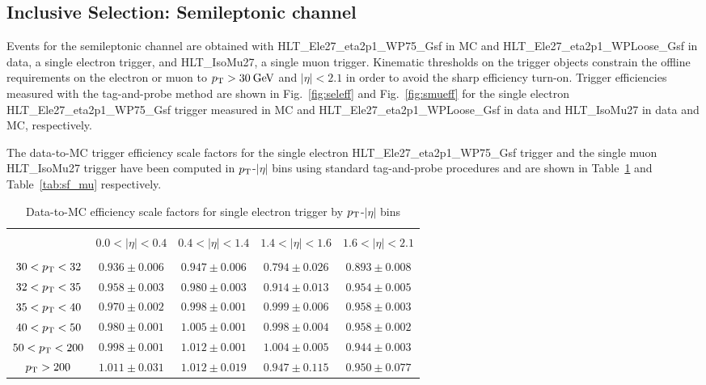 \subsection{Inclusive Selection: Semileptonic channel}
\label{subsec:sel_incl_semilept}

Events for the semileptonic channel are obtained with HLT\_Ele27\_eta2p1\_WP75\_Gsf in MC and HLT\_Ele27\_eta2p1\_WPLoose\_Gsf in data, a single electron trigger, and HLT\_IsoMu27, a single muon trigger. Kinematic thresholds on the trigger objects constrain the offline requirements on the electron or muon to $p_\mathrm{T}>30\:\mathrm{Ge\kern -0.1em V}$ and $|\eta|<2.1$ in order to avoid the sharp efficiency turn-on. Trigger efficiencies measured with the tag-and-probe method are shown in Fig.~\ref{fig:seleff} and Fig.~\ref{fig:smueff} for the single electron HLT\_Ele27\_eta2p1\_WP75\_Gsf trigger measured in MC and HLT\_Ele27\_eta2p1\_WPLoose\_Gsf in data and HLT\_IsoMu27 in data and MC, respectively.

The data-to-MC trigger efficiency scale factors for the single electron HLT\_Ele27\_eta2p1\_WP75\_Gsf trigger and the single muon HLT\_IsoMu27 trigger have been computed in $p_\mathrm{T}$-$|\eta|$ bins using standard tag-and-probe procedures and are shown in Table~\ref{tab:sf_ele} and Table~\ref{tab:sf_mu} respectively. 

\begin{table}[!ht]
\centering
\begin{tabular}{|c|c|c|c|c|}
\hline
&                                &                                &                                &                                                                 \\   
& $0.0 < |\eta| < 0.4$ & $0.4 < |\eta| < 1.4$ & $1.4 < |\eta| < 1.6$ & $1.6 < |\eta| < 2.1$    \\
&                                &                                &                                &                                                                \\   
\hline
$30 < p_\mathrm{T} <  32$ &  $0.936 \pm  0.006$  &  $0.947 \pm  0.006$  &  $0.794 \pm  0.026$  &  $0.893 \pm  0.008$ \\
\hline
$32 < p_\mathrm{T} <  35$ &  $0.958 \pm  0.003$  &  $0.980 \pm  0.003$  &  $0.914 \pm  0.013$  &  $0.954 \pm  0.005$ \\
\hline
$35 <p_\mathrm{T}  <  40$ &  $0.970 \pm  0.002$  &  $0.998 \pm  0.001$  &  $0.999 \pm  0.006$  &  $0.958 \pm  0.003$ \\
\hline
$40 < p_\mathrm{T} <  50$ &  $0.980 \pm  0.001$  &  $1.005 \pm  0.001$  &  $0.998 \pm  0.004$  &  $0.958 \pm  0.002$ \\
\hline
$50 < p_\mathrm{T} < 200$ & $0.998 \pm  0.001$  &  $1.012 \pm  0.001$  &  $1.004 \pm  0.005$  &  $0.944 \pm  0.003$ \\
\hline
      $p_\mathrm{T} > 200$   & $1.011 \pm  0.031$  &  $1.012 \pm  0.019$  &  $0.947 \pm  0.115$  &  $0.950 \pm  0.077 $\\	
\hline	
	
\end{tabular}
\caption{Data-to-MC efficiency scale factors for single electron trigger by $p_\mathrm{T}$-$|\eta|$ bins}
\label{tab:sf_ele}
\end{table}


